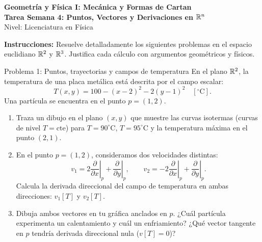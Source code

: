 \documentclass[11pt,letterpaper]{article}
\begin{document}
\setlength{\abovedisplayskip}{6pt}
\setlength{\belowdisplayskip}{6pt}
\setlength{\textfloatsep}{10pt}
\setlength{\intextsep}{8pt}
\color{blackmain}

\begin{center}
{\LARGE\textbf{Geometría y Física I: Mecánica y Formas de Cartan}}\\[0.25cm]
{\Large\textcolor{orangeacc}{\textbf{Tarea Semana 4: Puntos, Vectores y Derivaciones en $\mathbb{R}^n$}}}\\[0.2cm]
{\large\textcolor{graymuted}{Nivel: Licenciatura en Física}}\\[0.25cm]
\end{center}

\vspace{0.2cm}

\noindent\textbf{Instrucciones:} Resuelve detalladamente los siguientes problemas en el espacio euclidiano $\mathbb{R}^2$ y $\mathbb{R}^3$. Justifica cada cálculo con argumentos geométricos y físicos.


\begin{infobox}{Problema 1: Puntos, trayectorias y campos de temperatura}
En el plano $\mathbb{R}^2$, la temperatura de una placa metálica está descrita por el campo escalar:
\[
T(x, y) = 100 - (x - 2)^2 - 2(y - 1)^2 \quad [^\circ\text{C}].
\]
Una partícula se encuentra en el punto $p = (1, 2)$.
\begin{enumerate}[label=\alph*)]
    \item Traza un dibujo en el plano $(x, y)$ que muestre las curvas isotermas (curvas de nivel $T = \text{cte}$) para $T = 90^\circ\text{C}$, $T = 95^\circ\text{C}$ y la temperatura máxima en el punto $(2, 1)$.
    \item En el punto $p = (1, 2)$, consideramos dos velocidades distintas:
    \[
    v_1 = 2 \left.\frac{\partial}{\partial x}\right|_p + \left.\frac{\partial}{\partial y}\right|_p, \qquad
    v_2 = -2 \left.\frac{\partial}{\partial x}\right|_p + \left.\frac{\partial}{\partial y}\right|_p.
    \]
    Calcula la derivada direccional del campo de temperatura en ambas direcciones: $v_1[T]$ y $v_2[T]$.
    \item Dibuja ambos vectores en tu gráfica anclados en $p$. ¿Cuál partícula experimenta un calentamiento y cuál un enfriamiento? ¿Qué vector tangente en $p$ tendría derivada direccional nula ($v[T] = 0$)?
\end{enumerate}
\end{infobox}
\end{document}

